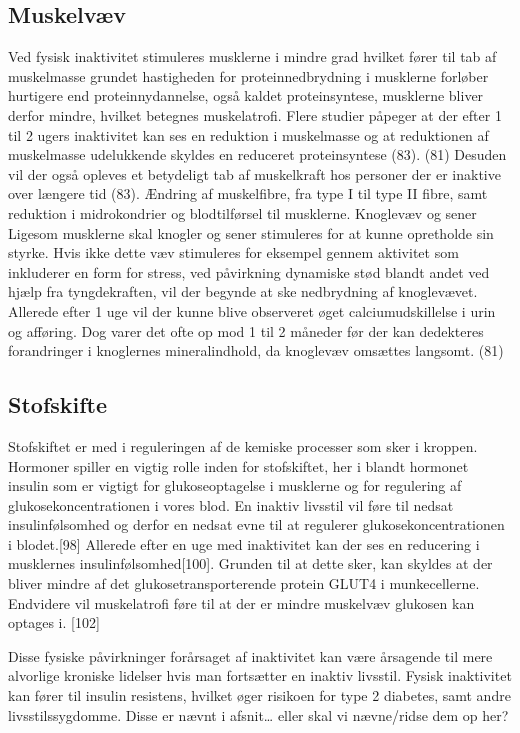 \subsection{Muskelvæv}
Ved fysisk inaktivitet stimuleres musklerne i mindre grad hvilket fører til tab af muskelmasse grundet hastigheden for proteinnedbrydning i musklerne forløber hurtigere end proteinnydannelse, også kaldet proteinsyntese, musklerne bliver derfor mindre, hvilket betegnes muskelatrofi. Flere studier påpeger at der efter 1 til 2 ugers inaktivitet kan ses en reduktion i muskelmasse og at reduktionen af muskelmasse udelukkende skyldes en reduceret proteinsyntese (83). (81) Desuden vil der også opleves et betydeligt tab af muskelkraft hos personer der er inaktive over længere tid (83). Ændring af muskelfibre, fra type I til type II fibre, samt reduktion i midrokondrier og blodtilførsel til musklerne.
Knoglevæv og sener
Ligesom musklerne skal knogler og sener stimuleres for at kunne opretholde sin styrke. Hvis ikke dette væv stimuleres for eksempel gennem aktivitet som inkluderer en form for stress, ved påvirkning dynamiske stød blandt andet ved hjælp fra tyngdekraften, vil der begynde at ske nedbrydning af knoglevævet. Allerede efter 1 uge vil der kunne blive observeret øget calciumudskillelse i urin og afføring. Dog varer det ofte op mod 1 til 2 måneder før der kan dedekteres forandringer i knoglernes mineralindhold, da knoglevæv omsættes langsomt.  (81) 

\subsection{Stofskifte}
Stofskiftet er med i reguleringen af de kemiske processer som sker i kroppen. Hormoner spiller en vigtig rolle inden for stofskiftet, her i blandt hormonet insulin som er vigtigt for glukoseoptagelse i musklerne og for regulering af glukosekoncentrationen i vores blod. En inaktiv livsstil vil føre til nedsat insulinfølsomhed og derfor en nedsat evne til at regulerer glukosekoncentrationen i blodet.[98] Allerede efter en uge med inaktivitet kan der ses en reducering i musklernes insulinfølsomhed[100]. Grunden til at dette sker, kan skyldes at der bliver mindre af det glukosetransporterende protein GLUT4 i munkecellerne. Endvidere vil muskelatrofi føre til at der er mindre muskelvæv glukosen kan optages i. [102]

Disse fysiske påvirkninger forårsaget af inaktivitet kan være årsagende til mere alvorlige kroniske lidelser hvis man fortsætter en inaktiv livsstil. Fysisk inaktivitet kan fører til insulin resistens, hvilket øger risikoen for type 2 diabetes, samt andre livsstilssygdomme. Disse er nævnt i afsnit… eller skal vi nævne/ridse dem op her? 
